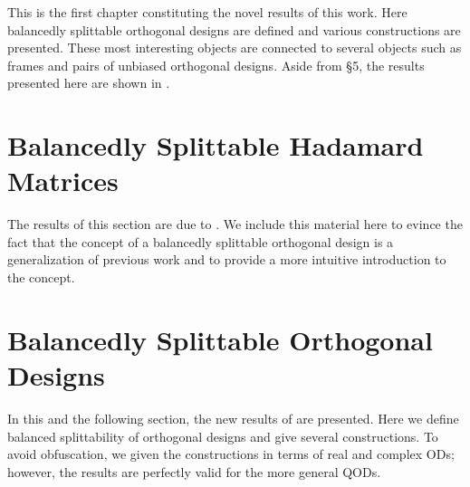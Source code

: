 \documentclass[../../main]{subfiles}
\begin{document}
This is the first chapter constituting the novel results of this work. Here
balancedly splittable orthogonal designs are defined and various constructions
are presented. These most interesting objects are connected to several objects
such as frames and pairs of unbiased orthogonal designs. Aside from \S 5, the
results presented here are shown in \cite{split-od}.

\fancyhf{}

\fancyhead[RO,LE]{\thepage}

 \section{\centering Balancedly Splittable Hadamard Matrices}
 The results of this section are due to \cite{splittable-hadamard}. We include
 this material here to evince the fact that the concept of a balancedly
 splittable orthogonal design is a generalization of previous work and to
 provide a more intuitive introduction to the concept. 
 
 \dinkus
 
 
 
 \fancyhf{}

 \fancyhead[RO,LE]{\thepage}
 
 \section{\centering Balancedly Splittable Orthogonal Designs}
 In this and the following section, the new results of \cite{split-od} are
 presented. Here we define balanced splittability of orthogonal designs and give
 several constructions. To avoid obfuscation, we given the constructions in
 terms of real and complex ODs; however, the results are perfectly valid for the
 more general QODs. 
 
 \dinkus
 
 
 
 \fancyhf{}

 \fancyhead[RO,LE]{\thepage}
\end{document}

